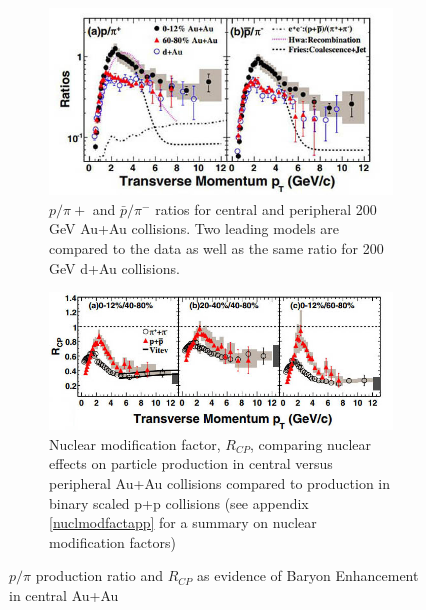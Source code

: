 \begin{figure}
\centering
\begin{subfigure}[b]{0.7\textwidth}
    \centering
    \includegraphics[width=\textwidth]{prevplots/ppiratiocentvsperiph.JPG}
    \caption{ $p/\pi{+}$ and $\bar{p}/\pi^{-}$ ratios for central and peripheral 200 GeV Au+Au collisions. Two leading models are compared to the data as well as the same ratio for 200 GeV d+Au collisions.}
    \label{fig:ppiratiocentvsperiph}
\end{subfigure}
\begin{subfigure}[b]{0.8\textwidth}
    \centering
    \includegraphics[width=\textwidth]{prevplots/Rcpcentvsperiph.jpg}
    \caption{Nuclear modification factor, $R_{CP}$, comparing nuclear effects on particle production in central versus peripheral Au+Au collisions compared to production in binary scaled p+p collisions (see appendix \ref{nuclmodfactapp} for a summary on nuclear modification factors)}
    \label{fig:Rcpcentvsperiph}
\end{subfigure}
\caption[Evidence of Baryon Enhancement in Au+Au collisions]{$p/\pi$ production ratio and $R_{CP}$ as evidence of Baryon Enhancement in central Au+Au}
\label{fig:baryonenhancementAA}
\end{figure}

